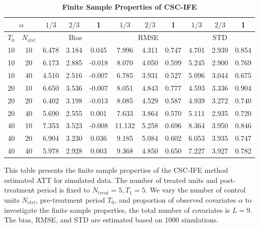 \documentclass[12pt]{article}
\begin{document}
\begin{table}[!ht]
    \centering
    \caption{\textbf{Finite Sample Properties of CSC-IFE}}
    \begin{tabular}{cc|ccc|ccc|ccc}
    \toprule
    \multicolumn{2}{c|}{$\alpha$} & $1/3$ & $2/3$ & 1 & $1/3$ & $2/3$ & 1 & $1/3$ & $2/3$ & 1 \\
    \hline
    $T_0$ & $N_{ctrl}$ & \multicolumn{3}{c|}{Bias} & \multicolumn{3}{c|}{RMSE}  & \multicolumn{3}{c}{STD} \\
    \hline
    10 & 10 & 6.478 & 3.184 & 0.045 & 7.996 & 4.311 & 0.747 & 4.701 & 2.939 & 0.854 \\
    10 & 20 & 6.173 & 2.885 & -0.018 & 8.070 & 4.050 & 0.599 & 5.245 & 2.900 & 0.769 \\
    10 & 40 & 4.510 & 2.516 & -0.007 & 6.785 & 3.931 & 0.527 & 5.096 & 3.044 & 0.675 \\
\cline{1-11}
    20 & 10 & 6.650 & 3.536 & -0.007 & 8.051 & 4.843 & 0.777 & 4.593 & 3.336 & 0.904 \\
    20 & 20 & 6.402 & 3.198 & -0.013 & 8.085 & 4.529 & 0.587 & 4.939 & 3.272 & 0.740 \\
    20 & 40 & 5.690 & 2.555 & 0.001 & 7.633 & 3.864 & 0.570 & 5.111 & 2.935 & 0.720 \\
\cline{1-11}
    40 & 10 & 7.353 & 3.523 & -0.008 & 11.132 & 5.258 & 0.696 & 8.364 & 3.950 & 0.846 \\
    40 & 20 & 6.904 & 3.230 & 0.036 & 9.185 & 5.084 & 0.602 & 6.053 & 3.935 & 0.747 \\
    40 & 40 & 5.978 & 2.928 & 0.003 & 9.368 & 4.850 & 0.650 & 7.227 & 3.927 & 0.782 \\
    \bottomrule
    \end{tabular}
    \begin{tablenotes}
        \item This table presents the finite sample properties of the CSC-IFE method estimated ATT for simulated data. The number of treated units and post-treatment period is fixed to $N_{treat} = 5, T_1=5$. We vary the number of control units $N_{ctrl}$, pre-treatment period $T_0$, and proportion of observed covariates $\alpha$ to investigate the finite sample properties, the total number of covariates is $L=9$. The bias, RMSE, and STD are estimated based on 1000 simulations.
    \end{tablenotes}
\end{table}
\end{document}
